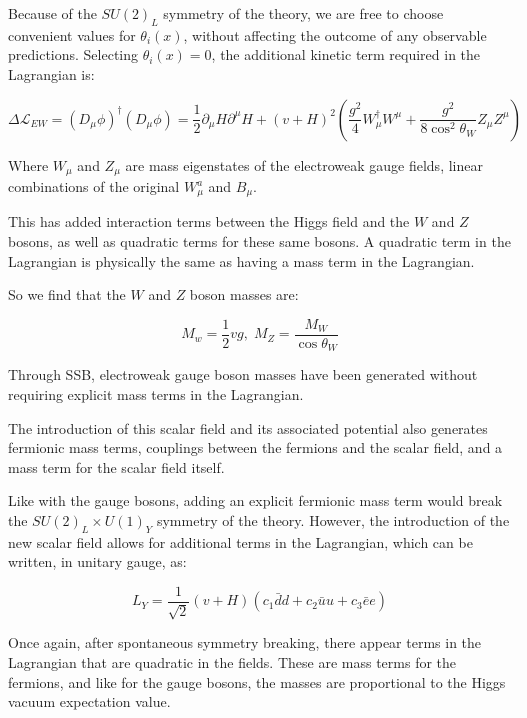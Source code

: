 Because of the $SU(2)_L$ symmetry of the theory, we are free to choose convenient values for $\theta_i(x)$,
without affecting the outcome of any observable predictions.
Selecting $\theta_i(x) = 0$, the additional kinetic term required in the Lagrangian is:

\begin{equation}\label{eq:higgs_kinetic}
    \Delta\mathcal{L}_{EW} = \left(D_{\mu}\phi\right)^{\dagger}\left(D_{\mu}\phi\right)
    =\frac{1}{2}\partial_{\mu}H \partial^{\mu}H + (v+H)^{2}\left(\frac{g^2}{4}W_\mu^\dagger W^\mu
    + \frac{g^2}{8\cos^2 {\theta_W}}Z_\mu Z^\mu\right)
\end{equation}

Where $W_\mu$ and $Z_\mu$ are mass eigenstates of the electroweak gauge fields,
linear combinations of the original $W_\mu^a$ and $B_\mu$.

This has added interaction terms between the Higgs field and the $W$ and $Z$ bosons,
as well as quadratic terms for these same bosons.
A quadratic term in the Lagrangian is physically the same as having a mass term in the Lagrangian.

So we find that the $W$ and $Z$ boson masses are:

\begin{equation}\label{eq:wz_masses}
    M_w = \frac{1}{2}vg,\; M_Z = \frac{M_W}{\cos{\theta_W}}
\end{equation}

Through SSB, electroweak gauge boson masses have been generated without requiring explicit mass terms in the Lagrangian.

The introduction of this scalar field and its associated potential also generates fermionic mass terms,
couplings between the fermions and the scalar field, and a mass term for the scalar field itself.

Like with the gauge bosons, adding an explicit fermionic mass term would break the $SU(2)_L \times U(1)_Y$ symmetry of the theory.
However, the introduction of the new scalar field allows for additional terms in the Lagrangian,
which can be written, in unitary gauge, as:

\begin{equation}\label{ew:yukawa_lagrangian}
    L_Y = \frac{1}{\sqrt{2}}\left(v+H\right)\left(c_{1}\bar{d}d+c_2\bar{u}u+c_3\bar{e}e\right)
\end{equation}

Once again, after spontaneous symmetry breaking, there appear terms in the Lagrangian that are quadratic in the fields.
These are mass terms for the fermions, and like for the gauge bosons, the masses are proportional to the Higgs vacuum
expectation value.

